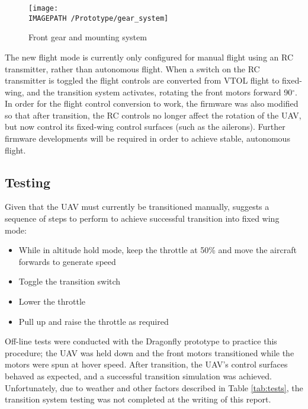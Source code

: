 \begin{figure}[!ht]
	\centering
	\texttt{[image: \\IMAGEPATH /Prototype/gear\_system]}
	\caption{Front gear and mounting system}
	\label{fig:gearsys}
\end{figure}

The new flight mode is currently only configured for manual flight using an RC transmitter, rather than autonomous flight. When a switch on the RC transmitter is toggled the flight controls are converted from VTOL flight to fixed-wing, and the transition system activates, rotating the front motors forward 90$^\circ$. In order for the flight control conversion to work, the firmware was also modified so that after transition, the RC controls no longer affect the rotation of the UAV, but now control its fixed-wing control surfaces (such as the ailerons). Further firmware developments will be required in order to achieve stable, autonomous flight.\\

\subsection{Testing}
Given that the UAV must currently be transitioned manually, \cite{ref:fireflyinstruction} suggests a sequence of steps to perform to achieve successful transition into fixed wing mode: 
\begin{itemize}
\item While in altitude hold mode, keep the throttle at 50\% and move the aircraft forwards to generate speed
\item Toggle the transition switch 
\item Lower the throttle
\item Pull up and raise the throttle as required		
\end{itemize}

Off-line tests were conducted with the Dragonfly prototype to practice this procedure; the UAV was held down and the front motors transitioned while the motors were spun at hover speed. After transition, the UAV's control surfaces behaved as expected, and a successful transition simulation was achieved. Unfortunately, due to weather and other factors described in Table \ref{tab:tests}, the transition system testing was not completed at the writing of this report.
